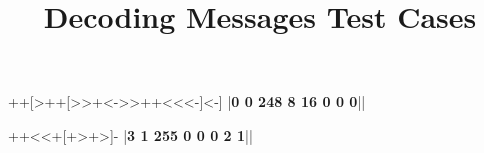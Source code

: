 \documentclass{../../codeproblem}
\begin{document}
\title{Decoding Messages Test Cases}

\begin{example}
++[>++[>>+<->>++<<<-]<-]
|\textbf{0 0 248 8 16 0 0 0}||\end{example}

\begin{example}
++<<+[+>+>]-
|\textbf{3 1 255 0 0 0 2 1}||\end{example}
\end{document}
